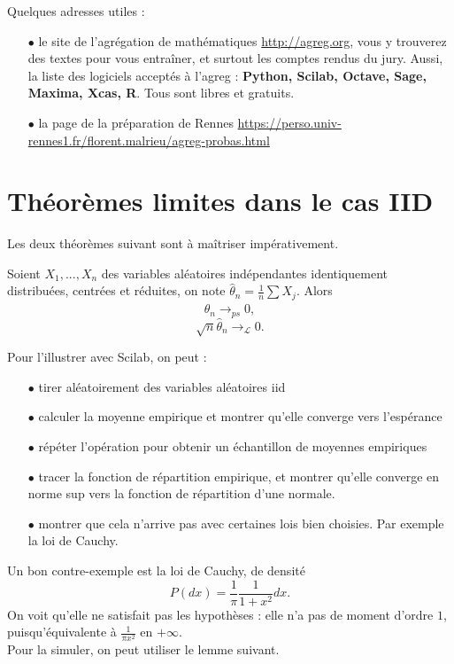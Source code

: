 Quelques adresses utiles :
\begin{itemize}
\item[$\bullet$]le site de l'agrégation de mathématiques \url{http://agreg.org}, vous y trouverez des textes pour vous entraîner, et surtout les comptes rendus du jury. Aussi, la liste des logiciels acceptés à l'agreg : \textbf{Python, Scilab, Octave, Sage, Maxima, Xcas, R}. Tous sont libres et gratuits.
\item[$\bullet$]la page de la préparation de Rennes  \url{https://perso.univ-rennes1.fr/florent.malrieu/agreg-probas.html}
\end{itemize}

\section{Théorèmes limites dans le cas IID}

Les deux théorèmes suivant sont à maîtriser impérativement.

\begin{thm}
Soient $X_1,...,X_n$ des variables aléatoires indépendantes identiquement distribuées, centrées et réduites, on note $\hat \theta_n =\frac{1}{n}\sum X_j$. Alors
\[\hat\theta_n\rightarrow _{ps}0,\]
\[\sqrt{n}\hat\theta_n\rightarrow _{\mathcal L}0.\] 
\end{thm}

Pour l'illustrer avec Scilab, on peut :\\

\begin{itemize}
\item[$\bullet$] tirer aléatoirement des variables aléatoires iid
\item[$\bullet$] calculer la moyenne empirique et montrer qu'elle converge vers l'espérance
\item[$\bullet$] répéter l'opération pour obtenir un échantillon de moyennes empiriques
\item[$\bullet$] tracer la fonction de répartition empirique, et montrer qu'elle converge en norme sup vers la fonction de répartition d'une normale. 
\item[$\bullet$] montrer que cela n'arrive pas avec certaines lois bien choisies. Par exemple la loi de Cauchy.\\
\end{itemize}

Un bon contre-exemple est la loi de Cauchy, de densité 
\[P(dx)=\frac{1}{\pi}\frac{1}{1+x^2}dx.\]
On voit qu'elle ne satisfait pas les hypothèses : elle n'a pas de moment d'ordre $1$, puisqu'équivalente à $\frac{1}{\pi x^2}$ en $+\infty$.\\ 
Pour la simuler, on peut utiliser le lemme suivant. 

